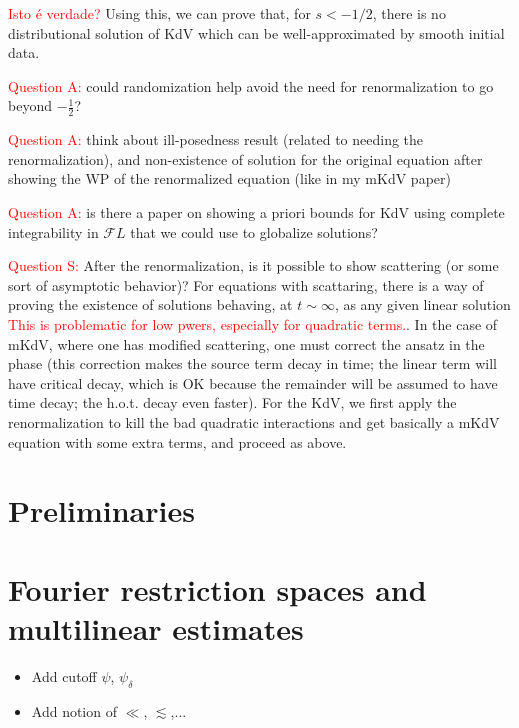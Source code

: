 \documentclass[a4paper, 11pt]{amsart}
\theoremstyle{plain}
\theoremstyle{definition}
\theoremstyle{remark}
\newcommand{\5}{\text{V}}
\newcommand{\les}{\lesssim}
\newcommand{\dl}{\delta}
\numberwithin{equation}{section}
\theoremstyle{mytheoremstyle} \newtheorem{nota}[thm]{Remark}
\theoremstyle{mytheoremstyle} \newtheorem{exemplo}[thm]{Example}
\newcommand{\red}{\color{red}}
\begin{document}
\textcolor{red}{Isto é verdade?} Using this, we can prove that, for $s<-1/2$, there is no distributional solution of KdV which can be well-approximated by smooth initial data.



\textcolor{red}{Question A:} could randomization help avoid the need for renormalization to go beyond $-\frac12$?

\textcolor{red}{Question A:} think about ill-posedness result (related to needing the renormalization), and non-existence of solution for the original equation after showing the WP of the renormalized equation (like in my mKdV paper)

\textcolor{red}{Question A:} is there a paper on showing a priori bounds for KdV using complete integrability in $\mathcal{F}L$ that we could use to globalize solutions?

\textcolor{red}{Question S:} After the renormalization, is it possible to show scattering (or some sort of asymptotic behavior)? For equations with scattaring, there is a way of proving the existence of solutions behaving, at $t\sim\infty$, as any given linear solution \textcolor{red}{This is problematic for low pwers, especially for quadratic terms.}. In the case of mKdV, where one has modified scattering, one must correct the ansatz in the phase (this correction makes the source term decay in time; the linear term will have critical decay, which is OK because the remainder will be assumed to have time decay; the h.o.t. decay even faster). For the KdV, we first apply the renormalization to kill the bad quadratic interactions and get basically a mKdV equation with some extra terms, and proceed as above.



\section{Preliminaries}

\section{Fourier restriction spaces and multilinear estimates}


{
\red
\begin{itemize}
\item Add cutoff $\psi$, $\psi_\dl$

\item Add notion of $\ll$, $\les$,...
\end{itemize}
}
\end{document}
